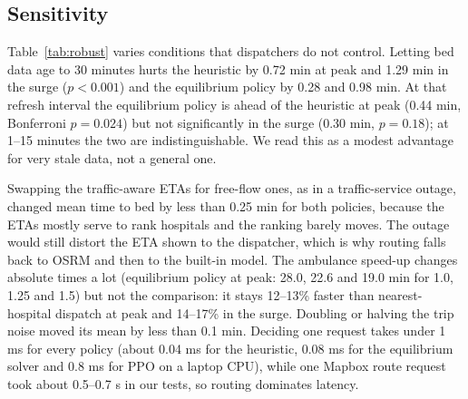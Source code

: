 \documentclass[conference]{IEEEtran}
\begin{document}
\subsection{Sensitivity}
Table~\ref{tab:robust} varies conditions that dispatchers do not control. Letting bed data age to 30 minutes hurts the heuristic by 0.72 min at peak and 1.29 min in the surge ($p<0.001$) and the equilibrium policy by 0.28 and 0.98 min. At that refresh interval the equilibrium policy is ahead of the heuristic at peak (0.44 min, Bonferroni $p=0.024$) but not significantly in the surge (0.30 min, $p=0.18$); at 1--15 minutes the two are indistinguishable. We read this as a modest advantage for very stale data, not a general one.

Swapping the traffic-aware ETAs for free-flow ones, as in a traffic-service outage, changed mean time to bed by less than 0.25 min for both policies, because the ETAs mostly serve to rank hospitals and the ranking barely moves. The outage would still distort the ETA shown to the dispatcher, which is why routing falls back to OSRM and then to the built-in model. The ambulance speed-up changes absolute times a lot (equilibrium policy at peak: 28.0, 22.6 and 19.0 min for 1.0, 1.25 and 1.5) but not the comparison: it stays 12--13\% faster than nearest-hospital dispatch at peak and 14--17\% in the surge. Doubling or halving the trip noise moved its mean by less than 0.1 min. Deciding one request takes under 1 ms for every policy (about 0.04 ms for the heuristic, 0.08 ms for the equilibrium solver and 0.8 ms for PPO on a laptop CPU), while one Mapbox route request took about 0.5--0.7 s in our tests, so routing dominates latency.

\begin{table}[t]
\caption{Mean time to bed (min) under varied conditions, 50 test seeds. Near.\ = nearest, Heur.\ = capacity heuristic, Nash = equilibrium assignment}
\label{tab:robust}
\centering\scriptsize
{}
\end{table}
\end{document}
